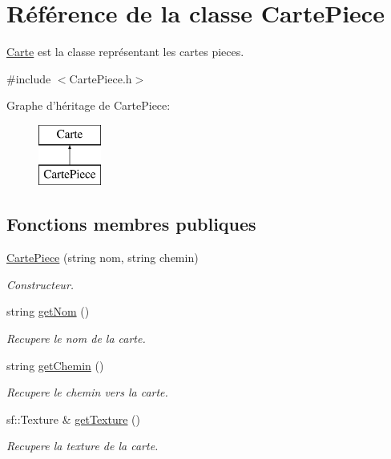 \hypertarget{classCartePiece}{\section{\-Référence de la classe \-Carte\-Piece}
\label{classCartePiece}
}


\hyperlink{classCarte}{\-Carte} est la classe représentant les cartes pieces.  




{\ttfamily \#include $<$\-Carte\-Piece.\-h$>$}

\-Graphe d'héritage de \-Carte\-Piece\-:\begin{figure}[H]
\begin{center}
\leavevmode
\includegraphics[height=2.000000cm]{classCartePiece}
\end{center}
\end{figure}
\subsection*{\-Fonctions membres publiques}
\begin{DoxyCompactItemize}
\item 
\hypertarget{classCartePiece_ad4adcc0b42ee2132149a2f0cd6323c01}{\hyperlink{classCartePiece_ad4adcc0b42ee2132149a2f0cd6323c01}{\-Carte\-Piece} (string nom, string chemin)}\label{classCartePiece_ad4adcc0b42ee2132149a2f0cd6323c01}

\begin{DoxyCompactList}\small\item\em \-Constructeur. \end{DoxyCompactList}\item 
string \hyperlink{classCartePiece_ac3664a8a367a1d84c8334662a970b2d1}{get\-Nom} ()
\begin{DoxyCompactList}\small\item\em \-Recupere le nom de la carte. \end{DoxyCompactList}\item 
string \hyperlink{classCartePiece_aecc861b0aa5cadeb453c0eae266fca37}{get\-Chemin} ()
\begin{DoxyCompactList}\small\item\em \-Recupere le chemin vers la carte. \end{DoxyCompactList}\item 
sf\-::\-Texture \& \hyperlink{classCartePiece_ab3c9961822338a255a764b9247989e93}{get\-Texture} ()
\begin{DoxyCompactList}\small\item\em \-Recupere la texture de la carte. \end{DoxyCompactList}\end{DoxyCompactItemize}


